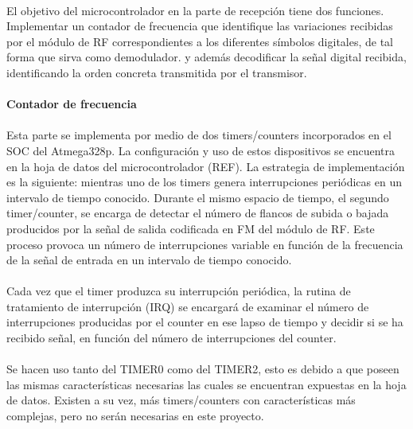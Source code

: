 \paragraph{} El objetivo del microcontrolador en la parte de recepción tiene dos funciones. Implementar un contador de frecuencia que identifique las variaciones recibidas por el m\'odulo de RF correspondientes a los diferentes s\'imbolos digitales, de tal forma que sirva como demodulador. y además decodificar la señal digital recibida, identificando la orden concreta transmitida por el transmisor.

\paragraph{Contador de frecuencia} 
\paragraph{}
Esta parte se implementa por medio de dos timers/counters incorporados en el SOC del Atmega328p. La configuraci\'on y uso de estos dispositivos se encuentra en la hoja de datos del microcontrolador (REF). La estrategia de implementación es la siguiente: mientras uno de los timers genera interrupciones periódicas en un intervalo de tiempo conocido. Durante el mismo espacio de tiempo, el segundo timer/counter, se encarga de detectar el número de flancos de subida o bajada producidos por la señal de salida codificada en FM del módulo de RF. Este proceso provoca un número de interrupciones variable en función de la frecuencia de la señal de entrada en un intervalo de tiempo conocido.

\paragraph{} Cada vez que el timer produzca su interrupción periódica, la rutina de tratamiento de interrupción (IRQ) se encargará de examinar el número de interrupciones producidas por el counter en ese lapso de tiempo y decidir si se ha recibido señal, en función del número de interrupciones del counter.

\paragraph{} Se hacen uso tanto del TIMER0 como del TIMER2, esto es debido a que poseen las mismas caracter\'isticas necesarias las cuales se encuentran expuestas en la hoja de datos. Existen a su vez, más timers/counters con características más complejas, pero no serán necesarias en este proyecto.
